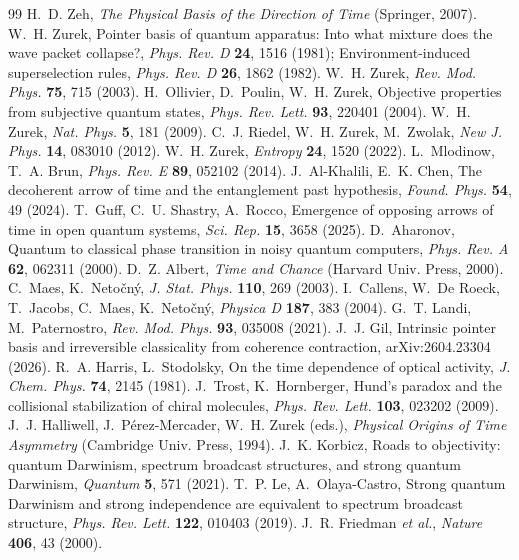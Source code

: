 \documentclass[11pt]{article}
\begin{document}
\begin{thebibliography}{99}\small
{} H.~D. Zeh, \emph{The Physical Basis of the Direction of Time} (Springer, 2007).
 W.~H. Zurek, Pointer basis of quantum apparatus: Into what mixture does the wave packet collapse?, \emph{Phys. Rev. D} \textbf{24}, 1516 (1981); Environment-induced superselection rules, \emph{Phys. Rev. D} \textbf{26}, 1862 (1982).
 W.~H. Zurek, \emph{Rev. Mod. Phys.} \textbf{75}, 715 (2003).
 H.~Ollivier, D.~Poulin, W.~H. Zurek, Objective properties from subjective quantum states, \emph{Phys. Rev. Lett.} \textbf{93}, 220401 (2004).
 W.~H. Zurek, \emph{Nat. Phys.} \textbf{5}, 181 (2009).
 C.~J. Riedel, W.~H. Zurek, M.~Zwolak, \emph{New J. Phys.} \textbf{14}, 083010 (2012).
 W.~H. Zurek, \emph{Entropy} \textbf{24}, 1520 (2022).
 L.~Mlodinow, T.~A. Brun, \emph{Phys. Rev. E} \textbf{89}, 052102 (2014).
 J.~Al-Khalili, E.~K. Chen, The decoherent arrow of time and the entanglement past hypothesis, \emph{Found. Phys.} \textbf{54}, 49 (2024).
 T.~Guff, C.~U. Shastry, A.~Rocco, Emergence of opposing arrows of time in open quantum systems, \emph{Sci. Rep.} \textbf{15}, 3658 (2025).
 D.~Aharonov, Quantum to classical phase transition in noisy quantum computers, \emph{Phys. Rev. A} \textbf{62}, 062311 (2000).
 D.~Z. Albert, \emph{Time and Chance} (Harvard Univ. Press, 2000).
 C.~Maes, K.~Neto\v{c}n\'y, \emph{J. Stat. Phys.} \textbf{110}, 269 (2003).
 I.~Callens, W.~De Roeck, T.~Jacobs, C.~Maes, K.~Neto\v{c}n\'y, \emph{Physica D} \textbf{187}, 383 (2004).
 G.~T. Landi, M.~Paternostro, \emph{Rev. Mod. Phys.} \textbf{93}, 035008 (2021).
 J.~J. Gil, Intrinsic pointer basis and irreversible classicality from coherence contraction, arXiv:2604.23304 (2026).
 R.~A. Harris, L.~Stodolsky, On the time dependence of optical activity, \emph{J. Chem. Phys.} \textbf{74}, 2145 (1981).
 J.~Trost, K.~Hornberger, Hund's paradox and the collisional stabilization of chiral molecules, \emph{Phys. Rev. Lett.} \textbf{103}, 023202 (2009).
 J.~J. Halliwell, J.~P\'erez-Mercader, W.~H. Zurek (eds.), \emph{Physical Origins of Time Asymmetry} (Cambridge Univ. Press, 1994).
 J.~K. Korbicz, Roads to objectivity: quantum Darwinism, spectrum broadcast structures, and strong quantum Darwinism, \emph{Quantum} \textbf{5}, 571 (2021).
 T.~P. Le, A.~Olaya-Castro, Strong quantum Darwinism and strong independence are equivalent to spectrum broadcast structure, \emph{Phys. Rev. Lett.} \textbf{122}, 010403 (2019).
 J.~R. Friedman \emph{et al.}, \emph{Nature} \textbf{406}, 43 (2000).
\end{thebibliography}
\end{document}
